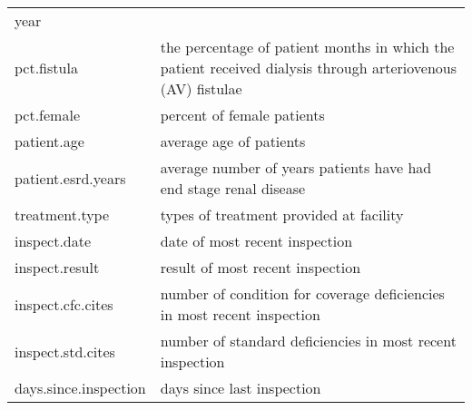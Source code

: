 \documentclass[11pt,reqno,letter]{article}
\theoremstyle{definition}
\theoremstyle{problem}
\begin{document}
\begin{table}
\begin{minipage}{\linewidth}
\begin{tabular}{ll}
                       year \\
      pct.fistula & the percentage of
                    patient months in which the patient received dialysis through arteriovenous (AV)
                    fistulae \\
      pct.female & percent of female patients \\
      patient.age & average age of patients \\
      patient.esrd.years & average number of years patients have had
                           end stage renal disease \\
      treatment.type & types of treatment provided at facility \\
      inspect.date & date of most recent inspection \\
      inspect.result & result of most recent inspection \\
      inspect.cfc.cites & number of condition for coverage
                          deficiencies in most recent inspection \\
      inspect.std.cites & number of standard deficiencies in most
                          recent inspection \\
      days.since.inspection & days since last inspection 
  \end{tabular}
\end{minipage}
\end{table}
\end{document}
